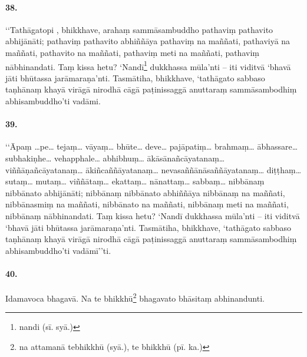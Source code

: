 
\paragraph{38.} ‘‘Tathāgatopi , bhikkhave, arahaṃ sammāsambuddho pathaviṃ pathavito abhijānāti; pathaviṃ pathavito abhiññāya pathaviṃ na maññati, pathaviyā na maññati, pathavito na maññati, pathaviṃ meti na maññati, pathaviṃ nābhinandati. Taṃ kissa hetu? ‘Nandī\footnote{nandi (sī. syā.)} dukkhassa mūla’nti – iti viditvā ‘bhavā jāti bhūtassa jarāmaraṇa’nti. Tasmātiha, bhikkhave, ‘tathāgato sabbaso taṇhānaṃ khayā virāgā nirodhā cāgā paṭinissaggā anuttaraṃ sammāsambodhiṃ abhisambuddho’ti vadāmi.

\paragraph{39.} ‘‘Āpaṃ …pe… tejaṃ… vāyaṃ… bhūte… deve… pajāpatiṃ… brahmaṃ… ābhassare… subhakiṇhe… vehapphale… abhibhuṃ… ākāsānañcāyatanaṃ… viññāṇañcāyatanaṃ… ākiñcaññāyatanaṃ… nevasaññānāsaññāyatanaṃ… diṭṭhaṃ… sutaṃ… mutaṃ… viññātaṃ… ekattaṃ… nānattaṃ… sabbaṃ… nibbānaṃ nibbānato abhijānāti; nibbānaṃ nibbānato abhiññāya nibbānaṃ na maññati, nibbānasmiṃ na maññati, nibbānato na maññati, nibbānaṃ meti na maññati, nibbānaṃ nābhinandati. Taṃ kissa hetu? ‘Nandī dukkhassa mūla’nti – iti viditvā ‘bhavā jāti bhūtassa jarāmaraṇa’nti. Tasmātiha, bhikkhave, ‘tathāgato sabbaso taṇhānaṃ khayā virāgā nirodhā cāgā paṭinissaggā anuttaraṃ sammāsambodhiṃ abhisambuddho’ti vadāmī’’ti.


\paragraph{40.} Idamavoca bhagavā. Na te bhikkhū\footnote{na attamanā tebhikkhū (syā.), te bhikkhū (pī. ka.)} bhagavato bhāsitaṃ abhinandunti.

